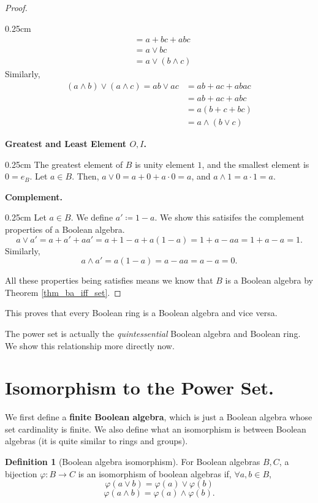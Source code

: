 \documentclass[10pt, letterpaper]{article}
\newcommand{\func}[3]{{#1}:#2\rightarrow #3}
\newenvironment{tabOver}[1]
{\begin{adjustwidth}{#1cm}{}}{\end{adjustwidth}}
\theoremstyle{definition}
\newtheorem{definition}{Definition}[section]
\begin{document}
\begin{proof}
\begin{tabOver}{0.25}
\begin{align*}
				&=a + bc + abc\\
				&=a\vee bc\\
				&=a\vee(b\wedge c)
	\end{align*}
	Similarly,
	\begin{align*}
		(a\wedge b)\vee(a\wedge c)=ab\vee ac&=ab + ac + abac\\
			&=ab+ac+abc\\
			&=a(b+c+bc)\\
			&=a\wedge(b\vee c)
	\end{align*}
	\end{tabOver}
	\textbf{Greatest and Least Element \(O, I\).}
	\begin{tabOver}{0.25}
		The greatest element of \(B\) is unity element \(1\), and the smallest element
		is \(0=e_B\). Let \(a\in B\). 
		Then, \(a\vee 0 = a + 0 + a\cdot 0 = a\), and
		\(a\wedge 1 = a\cdot 1 = a\).
	\end{tabOver}
	\textbf{Complement.}
	\begin{tabOver}{0.25}
		Let \(a\in B\). We define \(a'\coloneqq 1-a\). 
		We show this satisifes the complement properties of a Boolean algebra.
		\[a\vee a' = a + a' + aa' = a + 1-a + a(1-a)=1+a - aa = 1 + a - a = 1.\]
		Similarly,
		\[a\wedge a' = a(1-a)=a-aa=a-a=0.\]
	\end{tabOver}
	All these properties being satisfies means we know that \(B\) is a Boolean algebra
	by Theorem \ref{thm_ba_iff_set}.

\end{proof}

This proves that every Boolean ring is a Boolean algebra and vice versa.

The power set is actually the \textit{quintessential} Boolean algebra and Boolean ring.
We show this relationship more directly now.

\section{Isomorphism to the Power Set.}

We first define a \textbf{finite Boolean algebra}, which is just a Boolean algebra
whose set cardinality is finite. We also define what an isomorphism is
between Boolean algebras (it is quite similar to rings and groups).
\begin{definition}[Boolean algebra isomorphism]
	For Boolean algebras \(B,C\), a bijection \(\func{\varphi}{B}{C}\) is an isomorphism
	of boolean algebras if, \(\forall a,b\in B\),
	\[\varphi(a\vee b)=\varphi(a)\vee\varphi(b)\]
	\[\varphi(a\wedge b)=\varphi(a)\wedge\varphi(b).\]
\end{definition}
\end{document}

